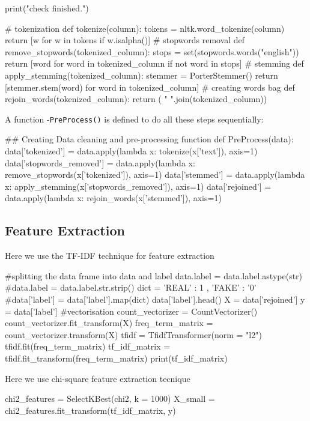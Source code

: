 \documentclass{josis}
\begin{document}
{{\begin{python}
        print("check finished.")
\end{python}   
\begin{python}
    # tokenization
    def tokenize(column):
        tokens = nltk.word_tokenize(column)
        return [w for w in tokens if w.isalpha()]
    # stopwords removal
    def remove_stopwords(tokenized_column):
        stops = set(stopwords.words("english"))
        return [word for word in tokenized_column if not word in stops]
    # stemming
    def apply_stemming(tokenized_column):
        stemmer = PorterStemmer()
        return [stemmer.stem(word) for word in tokenized_column]
    # creating words bag
    def rejoin_words(tokenized_column):
        return ( " ".join(tokenized_column))
\end{python}
A function -{\texttt{PreProcess()}} is defined to do all these steps sequentially:
\begin{python}
    ## Creating Data cleaning and pre-processing function
def PreProcess(data):
    data['tokenized'] = data.apply(lambda x: tokenize(x['text']), axis=1)
    data['stopwords_removed'] = data.apply(lambda x: remove_stopwords(x['tokenized']), axis=1)
    data['stemmed'] = data.apply(lambda x: apply_stemming(x['stopwords_removed']), axis=1)
    data['rejoined'] = data.apply(lambda x: rejoin_words(x['stemmed']), axis=1)
\end{python}
\subsection{Feature Extraction}
Here we use the TF-IDF technique for feature extraction
\begin{python}
#splitting the data frame into data and label
    data.label = data.label.astype(str)
#data.label = data.label.str.strip()
dict = { 'REAL' : 1 , 'FAKE' : '0'}
#data['label'] = data['label'].map(dict)
data['label'].head()
X = data['rejoined']
y = data['label']
#vectorisation
count_vectorizer = CountVectorizer()
count_vectorizer.fit_transform(X)
freq_term_matrix = count_vectorizer.transform(X)
tfidf = TfidfTransformer(norm = "l2")
tfidf.fit(freq_term_matrix)
tf_idf_matrix = tfidf.fit_transform(freq_term_matrix)
print(tf_idf_matrix)
\end{python}

Here we use chi-square feature extraction tecnique
\begin{python}
chi2_features = SelectKBest(chi2, k = 1000)
X_small = chi2_features.fit_transform(tf_idf_matrix, y)
\end{python}
}}
\end{document}
